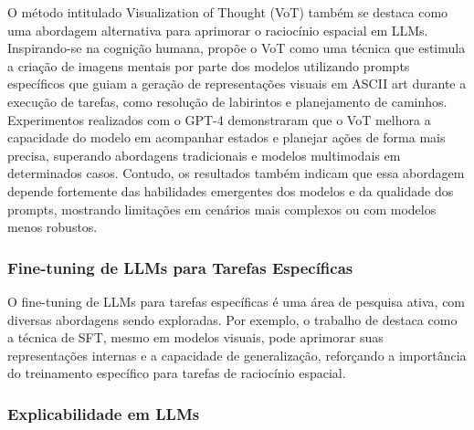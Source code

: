 O método intitulado Visualization of Thought (VoT) também se destaca como uma abordagem alternativa para aprimorar o raciocínio espacial em LLMs. Inspirando-se na cognição humana, \cite{wu2024mind} propõe o VoT como uma técnica que estimula a criação de imagens mentais por parte dos modelos utilizando prompts específicos que guiam a geração de representações visuais em ASCII art durante a execução de tarefas, como resolução de labirintos e planejamento de caminhos. Experimentos realizados com o GPT-4 demonstraram que o VoT melhora a capacidade do modelo em acompanhar estados e planejar ações de forma mais precisa, superando abordagens tradicionais e modelos multimodais em determinados casos. Contudo, os resultados também indicam que essa abordagem depende fortemente das habilidades emergentes dos modelos e da qualidade dos prompts, mostrando limitações em cenários mais complexos ou com modelos menos robustos.

\subsubsection{Fine-tuning de LLMs para Tarefas Específicas}

O fine-tuning de LLMs para tarefas específicas é uma área de pesquisa ativa, com diversas abordagens sendo exploradas. Por exemplo, o trabalho de \cite{wang2024picture} destaca como a técnica de SFT, mesmo em modelos visuais, pode aprimorar suas representações internas e a capacidade de generalização, reforçando a importância do treinamento específico para tarefas de raciocínio espacial. 

\subsubsection{Explicabilidade em LLMs}

